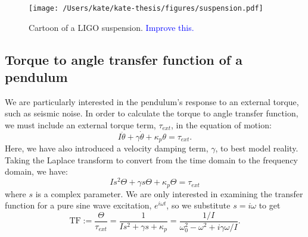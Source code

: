 \begin{figure}
\begin{centering}
\texttt{[image: /Users/kate/kate-thesis/figures/suspension.pdf]}
\caption{Cartoon of a LIGO suspension. \textcolor{blue}{Improve this.}}
\label{fig:suspension}
\end{centering}
\end{figure}




\subsection{Torque to angle transfer function of a pendulum}
\label{sec:t2a}
We are particularly interested in the pendulum's response to an
external torque, such as seismic noise. In order to calculate the
torque to angle transfer function, we must include an external torque
term, $\tau_{ext}$, in the equation of motion:
\begin{equation}
I \ddot{\theta} + \gamma \dot{\theta} + \kappa_p \theta = \tau_{ext}.
\label{eq:eqmotion}
\end{equation}
Here, we have also introduced a velocity damping term, $\gamma$, to
best model reality. Taking the Laplace transform to convert from the
time domain to the frequency domain, we have:
\begin{equation}
I s^2 \Theta + \gamma s \Theta + \kappa_p \Theta = \tau_{ext}
\end{equation}
where $s$ is a complex parameter. We are only interested in examining
the transfer function for a pure sine wave excitation, $e^{i\omega
  t}$, so we substitute $s=i\omega$ to get
\begin{equation}
\mathrm{TF} := \frac{\Theta}{\tau_{ext}} = \frac{1}{I s^2 + \gamma s +
  \kappa_p} = \frac{1/I}{\omega_0^2  - \omega^2 + i \gamma \omega / I}.
\label{eq:TF}
\end{equation}


